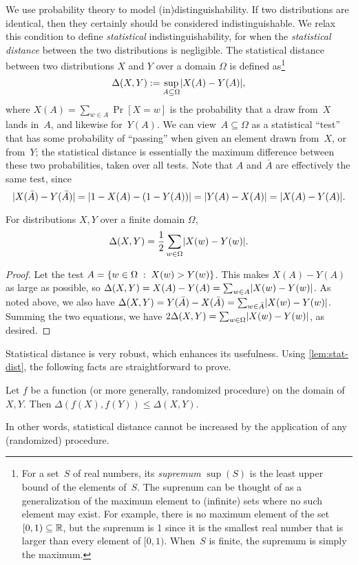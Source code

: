 \documentclass[11pt]{article}
\begin{document}
We use probability theory to model (in)distinguishability.  If two
distributions are identical, then they certainly should be considered
indistinguishable.  We relax this condition to define
\emph{statistical} indistinguishability, for when the
\emph{statistical distance} between the two distributions is
negligible.  The statistical distance between two distributions $X$
and $Y$ over a domain $\Omega$ is defined as\footnote{For a set~$S$ of
  real numbers, its \emph{supremum} $\sup(S)$ is the least upper bound
  of the elements of~$S$. The suprenum can be thought of as a
  generalization of the maximum element to (infinite) sets where no
  such element may exist. For example, there is no maximum element of
  the set $[0,1) \subseteq \mathbb{R}$, but the suprenum is 1 since it is the
  smallest real number that is larger than every element of
  $[0,1)$. When~$S$ is finite, the supremum is simply the maximum.}
\[ \Delta(X,Y) := \sup_{A \subseteq \Omega} \lvert X(A) - Y(A)\rvert, \]
where $X(A) = \sum_{w \in A} \Pr[X=w]$ is the probability that a draw
from~$X$ lands in~$A$, and likewise for~$Y(A)$. We can
view~$A \subseteq \Omega$ as a statistical ``test'' that has some
probability of ``passing'' when given an element drawn from~$X$, or
from~$Y$; the statistical distance is essentially the maximum
difference between these two probabilities, taken over all tests.
Note that $A$ and $\bar{A}$ are effectively the same test, since
\[ \lvert X(\bar{A})-Y(\bar{A})\rvert = \lvert1-X(A)-(1-Y(A))\rvert =
  \lvert Y(A)-X(A)\rvert = \lvert X(A)-Y(A)\rvert. \]

\begin{lemma}
  \label{lem:stat-dist}
  For distributions $X,Y$ over a finite domain $\Omega$,
  \[ \Delta(X,Y) = \frac12 \sum_{w \in \Omega} \lvert X(w) - Y(w)\rvert. \]
\end{lemma}

\begin{proof}
  Let the test $A = \{w \in \Omega\; :\; X(w) > Y(w)\}$.  This makes
  $X(A) - Y(A)$ as large as possible, so
  $\Delta(X,Y) = X(A)-Y(A) = \sum_{w \in A} \lvert X(w)-Y(w)\rvert$.  As
  noted above, we also have
  $\Delta(X,Y) = Y(\bar{A})-X(\bar{A}) = \sum_{w \in \bar{A}}
  \lvert X(w)-Y(w)\rvert$.  Summing the two equations, we have
  $2\Delta(X,Y) = \sum_{w \in \Omega} \lvert X(w)-Y(w)\rvert$, as desired.
\end{proof}

Statistical distance is very robust, which enhances its usefulness.
Using \cref{lem:stat-dist}, the following facts are
straightforward to prove.

\begin{lemma}
  \label{lem:ipl}
  Let $f$ be a function (or more generally, randomized procedure) on
  the domain of $X,Y$. Then $\Delta(f(X), f(Y)) \leq \Delta(X,Y)$.
\end{lemma}
In other words, statistical distance cannot be increased by the
application of any (randomized) procedure.
\end{document}
